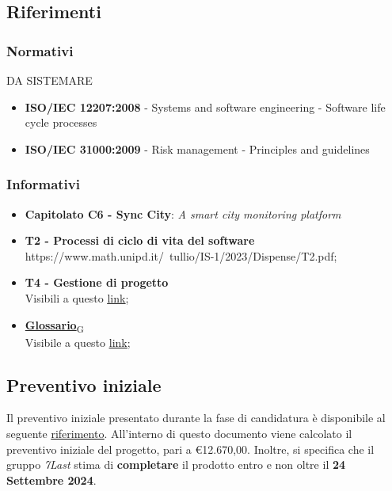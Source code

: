 \subsection{Riferimenti}
    \subsubsection{Normativi}DA SISTEMARE
        \begin{itemize}
            \item \textbf{ISO/IEC 12207:2008} - Systems and software engineering - Software life cycle processes
            \item \textbf{ISO/IEC 31000:2009} - Risk management - Principles and guidelines
        \end{itemize}
    \subsubsection{Informativi}
        \begin{itemize}
            \item \textbf{Capitolato C6 - Sync City}: \textit{A smart city monitoring platform}
            \item \textbf{T2 - Processi di ciclo di vita del software}\\ https://www.math.unipd.it/~tullio/IS-1/2023/Dispense/T2.pdf;
            \item \textbf{T4 - Gestione di progetto}\\ Visibili a questo \uline{\href{https://www.math.unipd.it/~tullio/IS-1/2023/Dispense/T4.pdf}{link}};
            \item \href{https://7last.github.io/docs/rtb/documentazione-interna/glossario#glossario}{\textbf{Glossario}\textsubscript{G}}\\ Visibile a questo \uline{\href{https://7last.github.io/docs/rtb/documentazione-interna/glossario}{link}};
        \end{itemize}
\subsection{Preventivo iniziale}
Il preventivo iniziale presentato durante la fase di candidatura è disponibile al seguente \uline{\href{https://github.com/7Last/docs/blob/main/1_candidatura/preventivo_costi_assunzione_impegni_v2.0.pdf}{riferimento}}. All'interno di questo documento viene calcolato il preventivo iniziale del progetto, pari a €12.670,00. Inoltre, si specifica che il gruppo \textit{7Last} stima di \textbf{completare} il prodotto entro e non oltre il \textbf{24 Settembre 2024}.